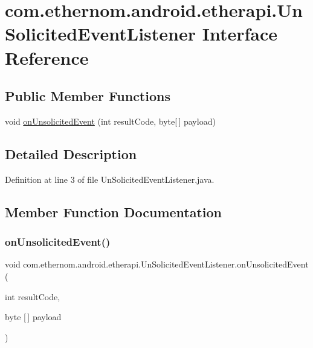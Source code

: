 \hypertarget{interfacecom_1_1ethernom_1_1android_1_1etherapi_1_1_un_solicited_event_listener}{}\section{com.\+ethernom.\+android.\+etherapi.\+Un\+Solicited\+Event\+Listener Interface Reference}
\label{interfacecom_1_1ethernom_1_1android_1_1etherapi_1_1_un_solicited_event_listener}
\subsection*{Public Member Functions}
\begin{DoxyCompactItemize}
\item 
void \mbox{\hyperlink{interfacecom_1_1ethernom_1_1android_1_1etherapi_1_1_un_solicited_event_listener_aab916d0c4a5c3f72975570d591be758f}{on\+Unsolicited\+Event}} (int result\+Code, byte\mbox{[}$\,$\mbox{]} payload)
\end{DoxyCompactItemize}


\subsection{Detailed Description}


Definition at line 3 of file Un\+Solicited\+Event\+Listener.\+java.



\subsection{Member Function Documentation}
\mbox{\label{interfacecom_1_1ethernom_1_1android_1_1etherapi_1_1_un_solicited_event_listener_aab916d0c4a5c3f72975570d591be758f}} 
\subsubsection{\texorpdfstring{on\+Unsolicited\+Event()}{onUnsolicitedEvent()}}
{\footnotesize\ttfamily void com.\+ethernom.\+android.\+etherapi.\+Un\+Solicited\+Event\+Listener.\+on\+Unsolicited\+Event (\begin{DoxyParamCaption}\item[{int}]{result\+Code,  }\item[{byte \mbox{[}$\,$\mbox{]}}]{payload }\end{DoxyParamCaption})}

